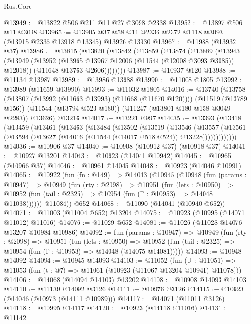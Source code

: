 \begin{lexlean}{RustCore}
\begin{coremodule}
@13949 := @13822 @506 @211 @11 @27 @3098 @2338
@13952 := @13897 @506 @11 @3098
@13965 := @13905 @37 @58 @11 @2336 @2372 @1118 @3093 (@13915 @2336 @13918 @13345) @13926 @13930
@13967 := @11988 (@13932 @37)
@13986 := @13815
    (@13820
      (@13842
        (@13859
          (@13874
            (@13889
              (@13943
                (@13949
                  (@13952 (@13965 @13967 @12006 (@11544 (@12008 @3093 @3085)) @12018))
                  (@11648 @13763 @2606))))))))
@13987 := @10937 @120
@13988 := @11134 @13987
@13989 := @13986 @13988
@13990 := @11008 @1805
@13992 := @13989 (@11659 @13990)
@13993 := @11032 @1805
@14016 := @13740
    (@13758
      (@13807 (@13992 (@11663 @13993) (@11668 (@11670 @120))))
      (@11519 (@13789 @156))
      (@11544 (@13794 @523 @180))
      (@11247 (@13801 @180 @158 @3049 @2283))
      @13626)
    @13216
@14017 := @13221 @997
@14035 := @13393
    (@13418
      (@13459
        (@13461
          (@13463
            (@13484
              (@13502
                (@13519
                  (@13546
                    (@13557
                      (@13561
                        (@13594 (@13627 (@14016 (@11544 (@14017 @518 @524)) @13228)))))))))))))
@14036 := @10906 @37
@14040 := @10908 (@10912 @37) (@10918 @37)
@14041 := @10927 @13201
@14043 := @10923 (@14041 @10942)
@14045 := @10965 (@10966 @37)
@14046 := @10961 @14045
@14048 := @10923 (@14046 @10991)
@14065 := @10922
    (fun (fn : @149) =>
    @14043
      (@10945
        (@10948
          (fun (params : @10947) =>
          @10949
            (fun (rty : @2098) =>
            @10951
              (fun (lets : @10950) =>
              @10952 (fun (tail : @2325) => @10954 (fun (Γ : @10953) => @14048 @11038))))))
        @11084))
    @652
@14068 := @11090 (@14041 (@10940 @652))
@14071 := @11003 (@11004 @652) @13204
@14075 := @10923 (@10995 (@14071 @11012) @11016)
@14076 := @11029 @652
@14081 := @11026 (@11028 @14076 @13207 @10984 @10986)
@14092 := fun (params : @10947) =>
  @10949
    (fun (rty : @2098) =>
    @10951
      (fun (lets : @10950) =>
      @10952 (fun (tail : @2325) => @10954 (fun (Γ : @10953) => @14048 (@14075 @14081)))))
@14093 := @10948 @14092
@14094 := @10945 @14093
@14103 := @11052
    (fun (U : @11051) => @11053 (fun (t : @7) => @11061 (@10923 (@11067 @13204 @10941) @11078)))
@14106 := @14068 (@14094 @14103) @13202
@14108 := @10908 @14093 @14103
@14110 := @11139 @14092 @3126
@14111 := @10976 @3126
@14115 := @10923 (@14046 (@10973 (@14111 @10989)))
@14117 := @14071 (@11011 @3126)
@14118 := @10995 @14117
@14120 := @10923 (@14118 @11016)
@14131 := @11142

\end{coremodule}
\end{lexlean}
